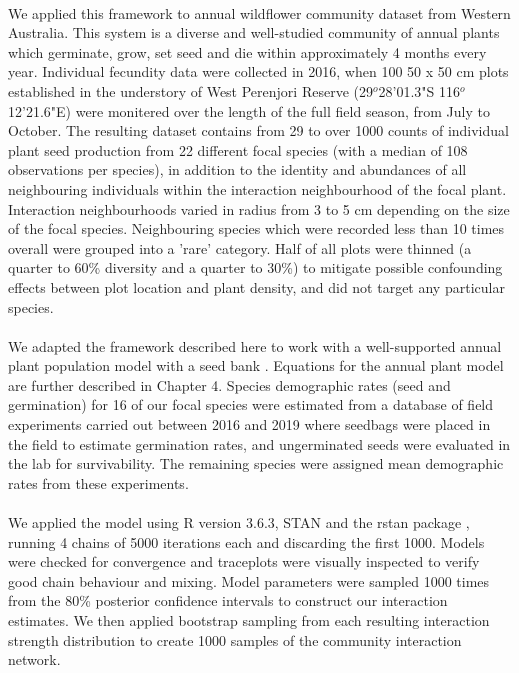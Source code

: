 \documentclass[a4,12pt]{article}
\begin{document}
        \paragraph{}
        We applied this framework to annual wildflower community dataset from Western Australia. This system is a diverse and well-studied community of annual plants which germinate, grow, set seed and die within approximately 4 months every year. Individual fecundity data were collected in 2016, when 100 50 x 50 cm plots established in the understory of West Perenjori Reserve (29$^o$28'01.3"S 116$^o$12'21.6"E) were monitered over the length of the full field season, from July to October. The resulting dataset contains from 29 to over 1000 counts of individual plant seed production from 22 different focal species (with a median of 108 observations per species), in addition to the identity and abundances of all neighbouring individuals within the interaction neighbourhood of the focal plant. Interaction neighbourhoods varied in radius from 3 to 5 cm depending on the size of the focal species. Neighbouring species which were recorded less than 10 times overall were grouped into a 'rare' category. Half of all plots were thinned (a quarter to 60\% diversity and a quarter to 30\%) to mitigate possible confounding effects between plot location and plant density, and did not target any particular species.

        \paragraph{}
        We adapted the framework described here to work with a well-supported annual plant population model with a seed bank \citep{Bimler2018a}. Equations for the annual plant model are further described in Chapter 4. Species demographic rates (seed and germination) for 16 of our focal species were estimated from a database of field experiments carried out between 2016 and 2019 where seedbags were placed in the field to estimate germination rates, and ungerminated seeds were evaluated in the lab for survivability. The remaining species were assigned mean demographic rates from these experiments. 

        \paragraph{}
        We applied the model using R version 3.6.3, STAN and the rstan package \citep{R2020, Carpenter2017, Rstan2020}, running 4 chains of 5000 iterations each and discarding the first 1000. Models were checked for convergence and traceplots were visually inspected to verify good chain behaviour and mixing. Model parameters were sampled 1000 times from the 80\% posterior confidence intervals to construct our interaction estimates. We then applied bootstrap sampling from each resulting interaction strength distribution to create 1000 samples of the community interaction network.
\end{document}
